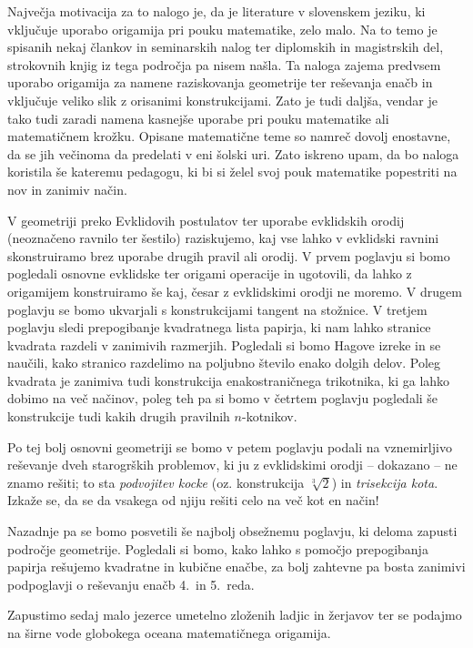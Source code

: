 Največja motivacija za to nalogo je, da je literature v slovenskem jeziku, ki vključuje uporabo origamija pri pouku matematike, zelo malo. Na to temo je spisanih nekaj člankov in seminarskih nalog ter diplomskih in magistrskih del, strokovnih knjig iz tega področja pa nisem našla. Ta naloga zajema predvsem uporabo origamija za namene raziskovanja geometrije ter reševanja enačb in vključuje veliko slik z orisanimi konstrukcijami. Zato je tudi daljša, vendar je tako tudi zaradi namena kasnejše uporabe pri pouku matematike ali matematičnem krožku. Opisane matematične teme so namreč dovolj enostavne, da se jih večinoma da predelati v eni šolski uri. Zato iskreno upam, da bo naloga koristila še kateremu pedagogu, ki bi si želel svoj pouk matematike popestriti na nov in zanimiv način.

V geometriji preko Evklidovih postulatov ter uporabe evklidskih orodij (neoznačeno ravnilo ter šestilo) raziskujemo, kaj vse lahko v evklidski ravnini skonstruiramo brez uporabe drugih pravil ali orodij. V prvem poglavju si bomo pogledali osnovne evklidske ter origami operacije in ugotovili, da lahko z origamijem konstruiramo še kaj, česar z evklidskimi orodji ne moremo. V drugem poglavju se bomo ukvarjali s konstrukcijami tangent na stožnice. V tretjem poglavju sledi prepogibanje kvadratnega lista papirja, ki nam lahko stranice kvadrata razdeli v zanimivih razmerjih. Pogledali si bomo Hagove izreke in se naučili, kako stranico razdelimo na poljubno število enako dolgih delov. Poleg kvadrata je zanimiva tudi konstrukcija enakostraničnega trikotnika, ki ga lahko dobimo na več načinov, poleg teh pa si bomo v četrtem poglavju pogledali še konstrukcije tudi kakih drugih pravilnih $n$-kotnikov.

Po tej bolj osnovni geometriji se bomo v petem poglavju podali na vznemirljivo reševanje dveh starogrških problemov, ki ju z evklidskimi orodji -- dokazano -- ne znamo rešiti; to sta \emph{podvojitev kocke} (oz. konstrukcija $\sqrt[3]{2}$) in \emph{trisekcija kota}. Izkaže se, da se da vsakega od njiju rešiti celo na več kot en način!

Nazadnje pa se bomo posvetili še najbolj obsežnemu poglavju, ki deloma zapusti področje geometrije. Pogledali si bomo, kako lahko s pomočjo prepogibanja papirja rešujemo kvadratne in kubične enačbe, za bolj zahtevne pa bosta zanimivi podpoglavji o reševanju enačb 4.\ in 5.\ reda.

Zapustimo sedaj malo jezerce umetelno zloženih ladjic in žerjavov ter se podajmo na širne vode globokega oceana matematičnega origamija.